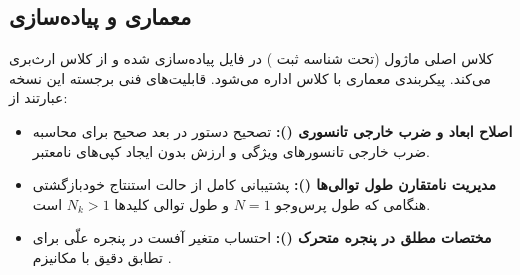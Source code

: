 \subsection{معماری و پیاده‌سازی}
کلاس اصلی ماژول  (تحت شناسه ثبت ) در فایل  پیاده‌سازی شده و از کلاس  ارث‌بری می‌کند. پیکربندی معماری با کلاس  اداره می‌شود. قابلیت‌های فنی برجسته این نسخه عبارتند از:
\begin{itemize}
    \item \textbf{اصلاح ابعاد و ضرب خارجی تانسوری ():} تصحیح دستور  در بعد صحیح برای محاسبه ضرب خارجی تانسورهای ویژگی و ارزش بدون ایجاد کپی‌های نامعتبر.
    \item \textbf{مدیریت نامتقارن طول توالی‌ها ():} پشتیبانی کامل از حالت استنتاج خودبازگشتی هنگامی که طول پرس‌وجو $N=1$ و طول توالی کلیدها $N_k > 1$ است.
    \item \textbf{مختصات مطلق در پنجره متحرک ():} احتساب متغیر آفست  در پنجره علّی برای تطابق دقیق با مکانیزم .
\end{itemize}
